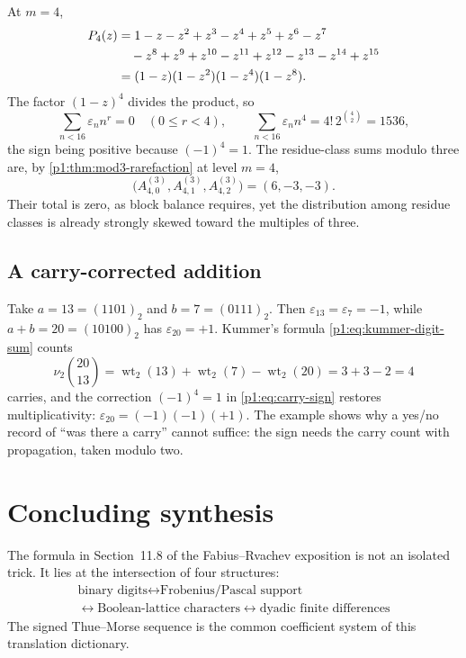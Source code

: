 \documentclass[11pt,oneside]{article}
\numberwithin{equation}{section}
\theoremstyle{definition}
\theoremstyle{remark}
\newcommand{\wt}{\operatorname{wt}_2}
\newcommand{\vtwo}{\nu_2}
\newcommand{\eps}{\varepsilon}
\begin{document}
At \(m=4\),
\begin{align}
  P_4(z)
  &=1-z-z^2+z^3-z^4+z^5+z^6-z^7
  \notag\\
  &\quad{}-z^8+z^9+z^{10}-z^{11}+z^{12}-z^{13}-z^{14}+z^{15}
  \notag\\
  &=(1-z)(1-z^2)(1-z^4)(1-z^8).
  \label{p1:eq:P4-example}
\end{align}
The factor \((1-z)^4\) divides the product, so
\begin{equation}
  \sum_{n<16}\eps_nn^r=0
  \quad(0\le r<4),
  \qquad
  \sum_{n<16}\eps_nn^4=4!\,2^{\binom42}=1536,
  \label{p1:eq:P4-moments}
\end{equation}
the sign being positive because \((-1)^4=1\).  The residue-class sums modulo
three are, by \cref{p1:thm:mod3-rarefaction} at level \(m=4\),
\begin{equation}
  \bigl(A^{(3)}_{4,0},A^{(3)}_{4,1},A^{(3)}_{4,2}\bigr)=(6,-3,-3).
  \label{p1:eq:P4-rarefied}
\end{equation}
Their total is zero, as block balance requires, yet the distribution among
residue classes is already strongly skewed toward the multiples of three.

\subsection{A carry-corrected addition}

Take \(a=13=(1101)_2\) and \(b=7=(0111)_2\).  Then
\(\eps_{13}=\eps_7=-1\), while \(a+b=20=(10100)_2\) has
\(\eps_{20}=+1\).  Kummer's formula \eqref{p1:eq:kummer-digit-sum} counts
\begin{equation}
  \vtwo\binom{20}{13}=\wt(13)+\wt(7)-\wt(20)=3+3-2=4
  \label{p1:eq:carry-example}
\end{equation}
carries, and the correction \((-1)^4=1\) in \eqref{p1:eq:carry-sign} restores
multiplicativity: \(\eps_{20}=(-1)(-1)(+1)\).  The example shows why a
yes/no record of ``was there a carry'' cannot suffice: the sign needs the
carry count with propagation, taken modulo two.

\section[Conclusion]{Concluding synthesis}
\label{p1:sec:conclusion}

The formula in Section~11.8 of the Fabius--Rvachev exposition is not an
isolated trick.  It lies at the intersection of four structures:
\begin{equation}
 \boxed{\begin{gathered}
 \text{binary digits}
 \longleftrightarrow
 \text{Frobenius/Pascal support}\\
 \longleftrightarrow
 \text{Boolean-lattice characters}
 \longleftrightarrow
 \text{dyadic finite differences}
 \end{gathered}}
 \label{p1:eq:four-way-dictionary}
\end{equation}
The signed Thue--Morse sequence is the common coefficient system of this
translation dictionary.
\end{document}
